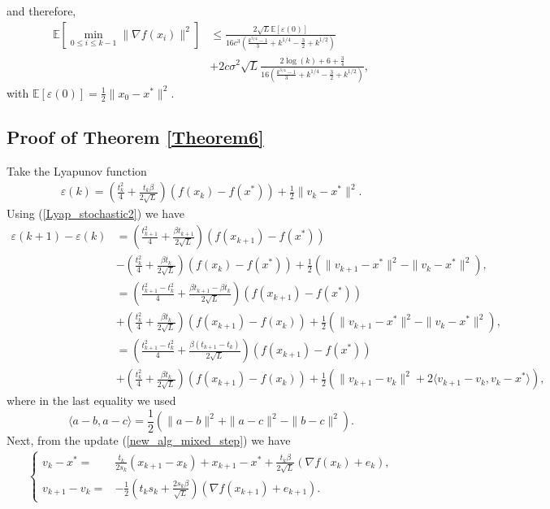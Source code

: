 \documentclass{article}
\theoremstyle{plain}
\theoremstyle{definition}
\theoremstyle{remark}
\begin{document}
and therefore,
\begin{align}
    \mathbb E\left[\min_{0\leq i\leq k-1}\|\nabla f(x_i)\|^2 \right] &\leq \frac{2\sqrt{L}\mathbb E[\varepsilon (0)]}{16c^3\left( \frac{k^{3/4}-1}{3} +k^{1/4}-\frac{3}{2}+k^{1/2}\right)}\nonumber\\
    &+2c\sigma^2\sqrt{L}\frac{2\log (k)+6+\frac{3}{4}}{16\left( \frac{k^{3/4}-1}{3} +k^{1/4}-\frac{3}{2}+k^{1/2}\right)},
\end{align}
with $\mathbb E[\varepsilon(0)]=\tfrac{1}{2}\|x_0-x^*\|^2$.
\subsection{Proof of Theorem \ref{Theorem6}}\label{thm7_proof}
Take the Lyapunov function
    \begin{align}\label{Lyap_stochastic2}
    \varepsilon(k)= (\frac{t_k^2}{4}+\frac{t_k\beta}{2\sqrt{L}})(f(x_k)-f(x^*))+\frac{1}{2}\|v_k-x^*\|^2.
    \end{align}
     Using (\ref{Lyap_stochastic2}) we have
    \begin{align}\label{Lyap2_stc_1}
        \varepsilon(k+1)-\varepsilon(k)&=(\frac{t_{k+1}^2}{4}+\frac{\beta t_{k+1}}{2\sqrt{L}})(f(x_{k+1})-f(x^*))\nonumber\\
        &-(\frac{t_{k}^2}{4}+\frac{\beta t_{k}}{2\sqrt{L}})(f(x_{k})-f(x^*))+\frac{1}{2}(\|v_{k+1}-x^*\|^2-\|v_{k}-x^*\|^2),\nonumber\\
        & = (\frac{t_{k+1}^2-t_k^2}{4}+\frac{\beta t_{k+1}-\beta t_k}{2\sqrt{L}})(f(x_{k+1})-f(x^*))\nonumber\\
        &+(\frac{t_{k}^2}{4}+\frac{\beta t_{k}}{2\sqrt{L}})(f(x_{k+1})-f(x_k))+\frac{1}{2}(\|v_{k+1}-x^*\|^2-\|v_{k}-x^*\|^2),\nonumber\\
        &= (\frac{t_{k+1}^2-t_k^2}{4}+\frac{\beta(t_{k+1}-t_k)}{2\sqrt{L}})(f(x_{k+1})-f(x^*))\nonumber\\
        &+(\frac{t_{k}^2}{4}+\frac{\beta t_{k}}{2\sqrt{L}})(f(x_{k+1})-f(x_k))+\frac{1}{2}(\|v_{k+1}-v_k\|^2+2\langle v_{k+1}-v_k,v_k-x^*\rangle),
    \end{align}
    where in the last equality we used 
    $$\langle a-b,a-c\rangle = \frac{1}{2}(\|a-b\|^2+\|a-c\|^2-\|b-c\|^2).$$
    Next, from the update (\ref{new_alg_mixed_step}) we have
    \begin{align}\label{Lyap2_stc_2}
        \left\{\begin{array}{cl}
             v_k-x^*=&\frac{t_k}{2s_k}(x_{k+1}-x_k)+x_{k+1}-x^*+\frac{t_k\beta }{2\sqrt{L}}(\nabla f(x_k)+e_k),  \\
            v_{k+1}-v_k=& -\frac{1}{2}(t_ks_k+\tfrac{2s_k\beta}{\sqrt{L}}) (\nabla f(x_{k+1})+e_{k+1}).
        \end{array}\right.
    \end{align}
\end{document}
